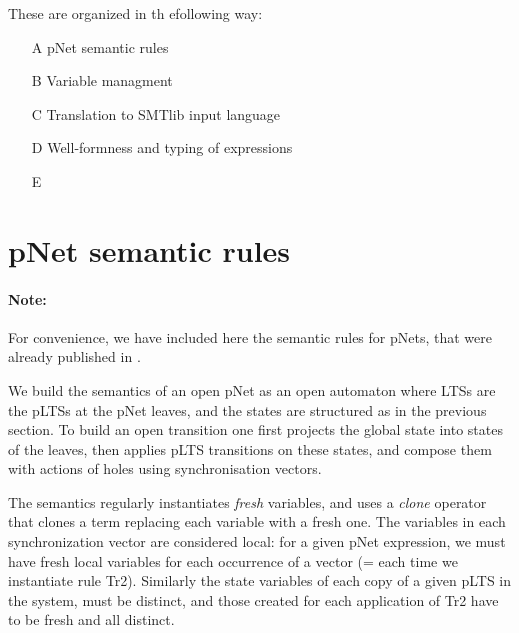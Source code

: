 \documentclass{lncs/llncs}
\begin{document}
These are organized in th efollowing way:

\begin{enumerate}
\item[A] pNet semantic rules
\item[B] Variable managment
\item[C] Translation to SMTlib input language
\item[D] Well-formness and typing of expressions
\item[E]
  
\end{enumerate}


\section{pNet semantic rules}
\label{appendix:semRules}

\paragraph{Note:} For convenience, we have included here the semantic rules for pNets,
that were already published in \cite{henrio:Forte2016}.

We build the semantics of an open pNet as an open automaton where
LTSs are the pLTSs at 
the pNet leaves, and the states are structured as in
the previous section. 
To build an open transition one first
 projects the global state into states of the leaves, then applies
pLTS transitions on these states, and compose them with actions of
holes using synchronisation vectors. %

The semantics   regularly instantiates \emph{fresh} variables, and uses a
\emph{clone} operator that clones a term replacing each variable with a
fresh one.
The variables in each synchronization vector are considered local:
for a given pNet expression, we must have fresh local variables for
each occurrence of a vector (= each time we instantiate rule
Tr2). Similarly the state variables of each copy of a
given pLTS in the system, must be distinct, and those created for each
application of Tr2 have to be fresh and all distinct. 

\end{document}
